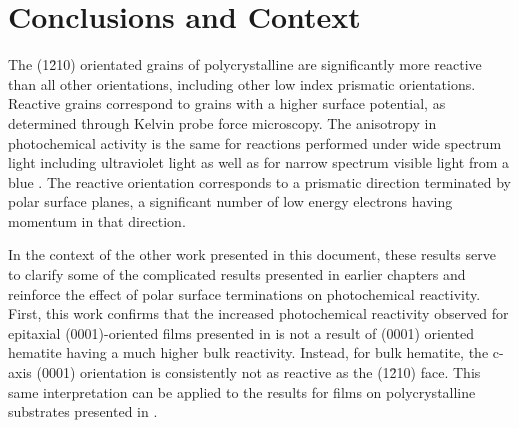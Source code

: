 \section{Conclusions and Context}\label{sec:ch9conclusion} 

The (1\={2}10) orientated grains of polycrystalline  are significantly more reactive than all other orientations, including other low index prismatic orientations. Reactive grains correspond to grains with a higher surface potential, as determined through Kelvin probe force microscopy. The anisotropy in photochemical activity is the same for reactions performed under wide spectrum light including ultraviolet light as well as for narrow spectrum visible light from a blue . The reactive orientation corresponds to a prismatic direction terminated by polar surface planes, a significant number of low energy electrons having momentum in that direction. 

In the context of the other work presented in this document, these results serve to clarify some of the complicated results presented in earlier chapters and reinforce the effect of polar surface terminations on photochemical reactivity. First, this work confirms that the increased photochemical reactivity observed for epitaxial (0001)-oriented  films presented in  is not a result of (0001) oriented hematite having a much higher bulk reactivity. Instead, for bulk hematite, the c-axis (0001) orientation is consistently not as reactive as the (1\={2}10) face. This same interpretation can be applied to the results for films on polycrystalline substrates presented in . 